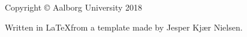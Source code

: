\thispagestyle{empty}
{
    \small
    \strut\vfill %
    \noindent Copyright \copyright{} Aalborg University 2018\par
    \vspace{0.2cm}
    \noindent Written in \LaTeX\text{ }from a template made by Jesper Kjær Nielsen. 
}
\clearpage
